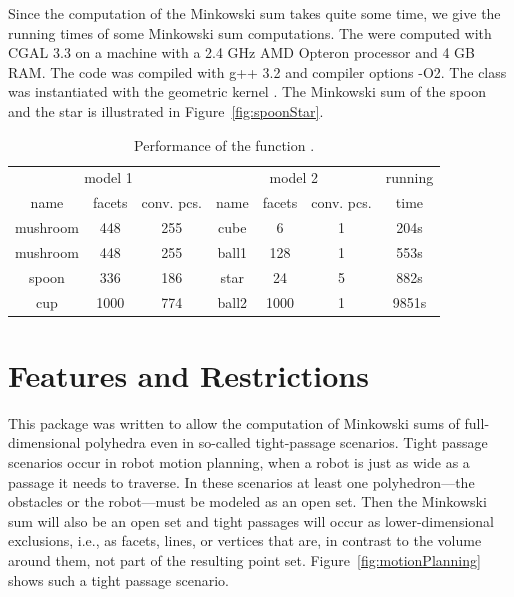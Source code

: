Since the computation of the Minkowski sum takes quite some time, we
give the running times of some Minkowski sum computations. The were
computed with CGAL 3.3 on a machine with a 2.4 GHz AMD Opteron
processor and 4 GB RAM. The code was compiled with
g++ 3.2 and compiler options -O2. The
 class was instantiated with the geometric
kernel . The Minkowski sum of the spoon
and the star is illustrated in Figure~\ref{fig:spoonStar}.

\begin{table}[h]
\begin{center}
\begin{tabular}{|ccc|ccc|c|}
\hline
\multicolumn{3}{|c|}{model 1} & \multicolumn{3}{|c|}{model 2} & running \\
name & facets & conv. pcs. & name & facets & conv. pcs. & time \\ 
\hline
mushroom & 448 & 255 & cube & 6 & 1 & 204s \\
mushroom & 448 & 255 & ball1 & 128 & 1 & 553s \\
spoon & 336 & 186 & star & 24 & 5 & 882s \\
cup & 1000 & 774 & ball2 & 1000 & 1 & 9851s \\
\hline
\end{tabular}
\caption{Performance of the function .}
\end{center}
\end{table}

\section{Features and Restrictions}
\label{sec:restrictions}

This package was written to allow the computation of Minkowski sums of
full-dimensional polyhedra even in so-called tight-passage scenarios.
Tight passage scenarios occur in robot motion planning, when a robot
is just as wide as a passage it needs to traverse. In these scenarios
at least one polyhedron---the obstacles or the robot---must be modeled
as an open set. Then the Minkowski sum will also be an open set and
tight passages will occur as lower-dimensional exclusions, i.e., as
facets, lines, or vertices that are, in contrast to the volume around
them, not part of the resulting point
set. Figure~\ref{fig:motionPlanning} shows such a tight passage
scenario.

